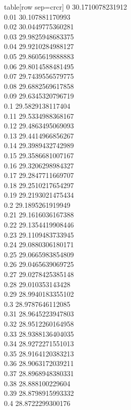   table[row sep=crcr]{%
0	30.1710078231912\\
0.01	30.107881170993\\
0.02	30.0449775360281\\
0.03	29.9825948683375\\
0.04	29.9210284988127\\
0.05	29.8605619888883\\
0.06	29.8014588481495\\
0.07	29.7439556579775\\
0.08	29.6882569617858\\
0.09	29.6345320796719\\
0.1	29.5829138117404\\
0.11	29.5334988368167\\
0.12	29.4863495069093\\
0.13	29.4414966856267\\
0.14	29.3989432742989\\
0.15	29.3586681007167\\
0.16	29.3206298984327\\
0.17	29.2847711669707\\
0.18	29.2510217654297\\
0.19	29.2193021475434\\
0.2	29.1895261919949\\
0.21	29.1616036167388\\
0.22	29.1354419908446\\
0.23	29.1109483733945\\
0.24	29.0880306180171\\
0.25	29.0665983854809\\
0.26	29.0465639069725\\
0.27	29.0278425385148\\
0.28	29.010353143428\\
0.29	28.9940183355102\\
0.3	28.9787646112085\\
0.31	28.9645223947803\\
0.32	28.9512260164958\\
0.33	28.9388136404035\\
0.34	28.9272271551013\\
0.35	28.9164120383213\\
0.36	28.9063172039211\\
0.37	28.8968948380331\\
0.38	28.888100229604\\
0.39	28.8798915993332\\
0.4	28.8722299300176\\
}
